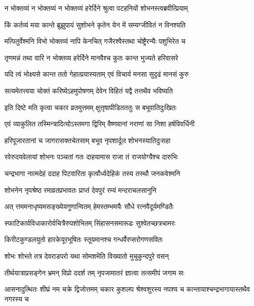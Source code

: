 \twolineshloka
{न भोक्तव्यं न भोक्तव्यं न भोक्तव्यं हरेर्दिने}
{श्रुत्वा पटहनियों शोभनस्त्वब्रवीत्प्रियाम्} %

\twolineshloka
{किं कर्तव्यं मया कान्ते ब्रूझुपायं सुशोभने}
{कृतेन येन में सम्यग्जीवितं न विनश्यति} %


\twolineshloka
{मत्पितुर्वेश्मनि विभो भोक्तव्यं नापि केनचित्}
{गजैरश्वैस्तथा चोष्ट्रैरन्यैः पशुभिरेत च} %

\twolineshloka
{तृणमन्नं तथा वारि न भोक्तव्य हरेर्दिने}
{मानवैश्च कुतः कान्त भुज्यते हरिवासरे} %

\twolineshloka
{यदि त्वं भोक्ष्यसे कान्त ततो गेहात्प्रयास्यताम्}
{एवं विचार्य मनसा सुदृढं मानसं कुरु} %


\twolineshloka
{सत्यमेतत्त्वया चोक्तं करिष्येऽहमुपोषणम्}
{देवेन विहितं यद्वै तत्तथैव भविष्यति} %

\twolineshloka
{इति दिष्टे मति कृत्वा चकार व्रतमुत्तमम्}
{क्षुत्तृषापीडितततुः स बभूवातिदुःखितः} %

\twolineshloka
{एवं व्याकुलित तस्मिन्त्रादित्योऽस्तमगा द्विरिम्}
{वैष्णवानां नराणां सा निशा हर्षविवर्धिनी} %

\twolineshloka
{हरिपूजारतानां च जागरासक्तचेतसाम्}
{बभूव नृपशार्दूल शोभनस्यातिदुःसहा} %

\twolineshloka
{रवेरुदयवेलायां शोभनः पञ्चतां गतः}
{दाहयामास राजा तं राजयोग्यैश्च दारुभिः} %

\twolineshloka
{चन्द्रभागा नात्मदेहं ददाह पिटवारिता}
{कृत्वौर्ध्वदेहिकं तस्य तस्थौ जनकवेश्मनि} %

\twolineshloka
{शोभनेन नृपश्रेष्ठ रमाव्रतप्रभावतः}
{प्राप्तं देवपुरं रम्यं मन्दराचलसानुनि} %

\twolineshloka
{अत् त्तममनाधृष्यमसङ्ख्येयगुणान्वितम्}
{हेमस्तम्भमयैः सौधे रत्नवैदूर्यमण्डितैः} %

\twolineshloka
{स्फाटिकार्वविधाकारोर्वचित्रैरुपशोभितम्}
{सिंहासनसमारूढः सुश्वेतच्छत्रचामरः} %

\twolineshloka
{किरीटकुण्डलयुतो हारकेयूरभूषितः}
{स्तूयमानश्च गन्धर्वैरप्सरोगणसवितः} %

\twolineshloka
{शोभः शोभते तत्र देवराडपरो यथा}
{सोमशमॆति विख्यातो मुचुकुन्दपुरे वसन्} %

\twolineshloka
{तीर्थयात्राप्रसङ्गेन भ्रमन् विप्रो ददर्श तम्}
{नृपजामातरं ज्ञात्वा तत्समीपं जगाम सः} %


\threelineshloka
{आसनादुत्थितः शीघ्रं नम चक्रे द्विजोत्तमम्}
{चकार कुशलप श्रेश्वशुरस्य नपश्य च}
{कान्तायाश्चन्द्रभागायास्तथैव नगरस्य च} %

